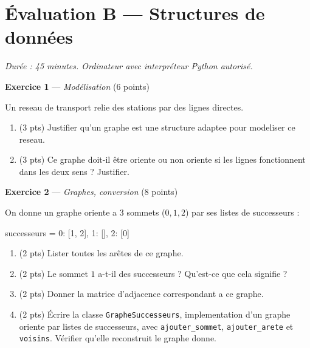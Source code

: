 \section*{Évaluation B --- Structures de données}
\textit{Durée : 45 minutes. Ordinateur avec interpréteur Python autorisé.}


\bigskip

\textbf{Exercice 1} --- \textit{Modélisation} \hfill (6 points)

Un reseau de transport relie des stations par des lignes directes.
\begin{enumerate}
  \item (3 pts) Justifier qu'un graphe est une structure adaptee pour modeliser ce reseau.
  \item (3 pts) Ce graphe doit-il être oriente ou non oriente si les lignes fonctionnent dans les deux sens ? Justifier.
\end{enumerate}

\bigskip

\textbf{Exercice 2} --- \textit{Graphes, conversion} \hfill (8 points)

On donne un graphe oriente a $3$ sommets ($0,1,2$) par ses listes de successeurs :
\begin{python}
successeurs = {0: [1, 2], 1: [], 2: [0]}
\end{python}
\begin{enumerate}
  \item (2 pts) Lister toutes les arêtes de ce graphe.
  \item (2 pts) Le sommet $1$ a-t-il des successeurs ? Qu'est-ce que cela signifie ?
  \item (2 pts) Donner la matrice d'adjacence correspondant a ce graphe.
  \item (2 pts) Écrire la classe \lstinline{GrapheSuccesseurs}, implementation d'un graphe
  oriente par listes de successeurs, avec \lstinline{ajouter_sommet}, \lstinline{ajouter_arete}
  et \lstinline{voisins}. Vérifier qu'elle reconstruit le graphe donne.
\end{enumerate}


